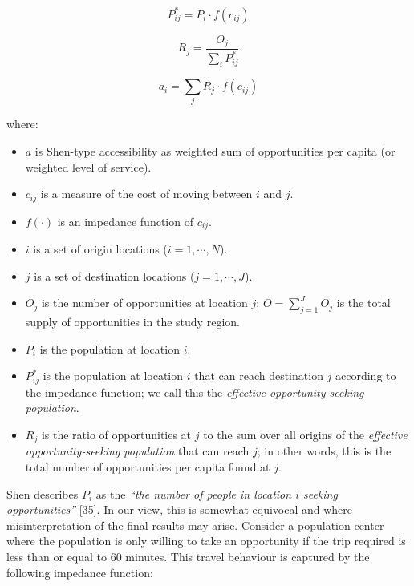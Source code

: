 \documentclass[10pt,letterpaper]{article}
\providecommand{\tightlist}{%
  \setlength{\itemsep}{0pt}\setlength{\parskip}{0pt}}
\begin{document}
\begin{equation}
\label{eq:effective-opportunity-seeking-population}
P_{ij}^{*} = {P_{i} \cdot f(c_{ij})}
\end{equation}

\begin{equation}
\label{eq:level-of-service}
R_{j} = \frac{O_{j}}{\sum_i P_{ij}^*}
\end{equation}

\begin{equation}
\label{eq:2SFCA-step2}
a_{i} = {\sum_j R_{j} \cdot f(c_{ij})}
\end{equation}

\noindent where:

\begin{itemize}
\tightlist
\item
  \(a\) is Shen-type accessibility as weighted sum of opportunities per
  capita (or weighted level of service).
\item
  \(c_{ij}\) is a measure of the cost of moving between \(i\) and \(j\).
\item
  \(f(\cdot)\) is an impedance function of \(c_{ij}\).
\item
  \(i\) is a set of origin locations (\(i = 1,\cdots,N\)).
\item
  \(j\) is a set of destination locations (\(j = 1,\cdots,J\)).
\item
  \(O_j\) is the number of opportunities at location \(j\);
  \(O = \sum_{j=1}^J O_j\) is the total supply of opportunities in the
  study region.
\item
  \(P_i\) is the population at location \(i\).
\item
  \(P_{ij}^*\) is the population at location \(i\) that can reach
  destination \(j\) according to the impedance function; we call this
  the \emph{effective opportunity-seeking population}.
\item
  \(R_j\) is the ratio of opportunities at \(j\) to the sum over all
  origins of the \emph{effective opportunity-seeking population} that
  can reach \(j\); in other words, this is the total number of
  opportunities per capita found at \(j\).
\end{itemize}

Shen describes \(P_i\) as the \emph{``the number of people in location
\(i\) seeking opportunities''} {[}35{]}. In our view, this is somewhat
equivocal and where misinterpretation of the final results may arise.
Consider a population center where the population is only willing to
take an opportunity if the trip required is less than or equal to 60
minutes. This travel behaviour is captured by the following impedance
function:
\end{document}
